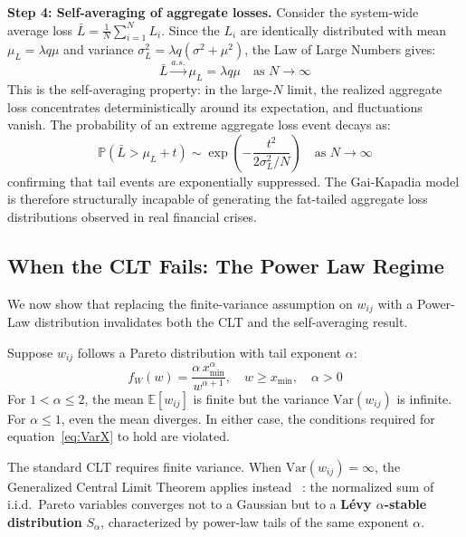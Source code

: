 \documentclass[a4paper,12pt,twoside]{article}
\begin{document}
\textbf{Step 4: Self-averaging of aggregate losses.}
Consider the system-wide average loss $\bar{L} = \frac{1}{N}
\sum_{i=1}^{N} L_i$. Since the $L_i$ are identically distributed with 
mean $\mu_L = \lambda q\mu$ and variance $\sigma_L^2 = \lambda q
(\sigma^2 + \mu^2)$, the Law of Large Numbers gives:
\begin{equation}
    \bar{L} \xrightarrow{a.s.} \mu_L = \lambda q\mu 
    \quad \text{as } N \to \infty
    \label{eq:self_averaging}
\end{equation}
This is the self-averaging property: in the large-$N$ limit, the 
realized aggregate loss concentrates deterministically around its 
expectation, and fluctuations vanish. The probability of an extreme 
aggregate loss event decays as:
\begin{equation}
    \mathbb{P}\!\left(\bar{L} > \mu_L + t\right) \sim 
    \exp\!\left(-\frac{t^2}{2\sigma_L^2/N}\right) 
    \quad \text{as } N \to \infty
    \label{eq:tail_decay}
\end{equation}
confirming that tail events are exponentially suppressed. The 
Gai-Kapadia model is therefore structurally incapable of generating 
the fat-tailed aggregate loss distributions observed in real financial 
crises.

\subsection{When the CLT Fails: The Power Law Regime}
\label{sec:powerlaw_proof}

We now show that replacing the finite-variance assumption on $w_{ij}$ 
with a Power-Law distribution invalidates both the CLT and the 
self-averaging result.

Suppose $w_{ij}$ follows a Pareto distribution with tail exponent 
$\alpha$:
\begin{equation}
    f_W(w) = \frac{\alpha\, x_{\min}^\alpha}{w^{\alpha+1}}, 
    \quad w \geq x_{\min},\quad \alpha > 0
    \label{eq:pareto}
\end{equation}
For $1 < \alpha \leq 2$, the mean $\mathbb{E}[w_{ij}]$ is finite but 
the variance $\text{Var}(w_{ij})$ is infinite. For $\alpha \leq 1$, 
even the mean diverges. In either case, the conditions required for 
equation~\eqref{eq:VarX} to hold are violated.

The standard CLT requires finite variance. When $\text{Var}(w_{ij}) = 
\infty$, the Generalized Central Limit Theorem applies instead ~\cite{gnedenko1954}: the 
normalized sum of i.i.d.\ Pareto variables converges not to a Gaussian 
but to a \textbf{Lévy $\alpha$-stable distribution} $S_\alpha$, 
characterized by power-law tails of the same exponent $\alpha$.
\end{document}

